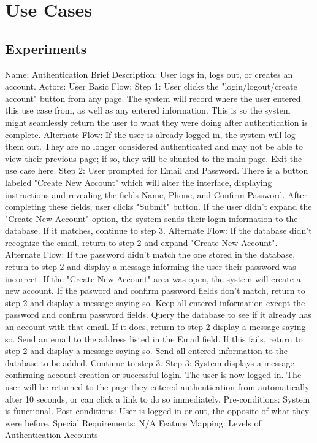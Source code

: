\section{Use Cases}
\subsection{Experiments}
\begin{outline}[enumerate]

\1 Name: Authentication
\2 Brief Description: User logs in, logs out, or creates an account.
\2 Actors: User
\2 Basic Flow:
\3 Step 1: User clicks the "login/logout/create account" button from any page.
\4 The system will record where the user entered this use case from, as well as any entered information.  This is so the system might seamlessly return the user to what they were doing after authentication is complete.
\4 Alternate Flow: If the user is already logged in, the system will log them out.  They are no longer considered authenticated and may not be able to view their previous page; if so, they will be shunted to the main page.  Exit the use case here.
\3 Step 2: User prompted for Email and Password.  There is a button labeled "Create New Account" which will alter the interface, displaying instructions and revealing the fields Name, Phone, and Confirm Password.  After completing these fields, user clicks "Submit" button.
\4 If the user didn't expand the "Create New Account" option, the system sends their login information to the database.  If it matches, continue to step 3.
\4 Alternate Flow: If the database didn't recognize the email, return to step 2 and expand "Create New Account".
\4 Alternate Flow: If the password didn't match the one stored in the database, return to step 2 and display a message informing the user their password was incorrect.
\3 If the "Create New Account" area was open, the system will create a new account.
\4 If the pasword and confirm password fields don't match, return to step 2 and display a message saying so.  Keep all entered information except the password and confirm password fields.
\4 Query the database to see if it already has an account with that email.  If it does, return to step 2 display a message saying so.
\4 Send an email to the address listed in the Email field.  If this fails, return to step 2 and display a message saying so.
\4 Send all entered information to the database to be added.  Continue to step 3.
\3 Step 3: System displays a message confirming account creation or successful login.  The user is now logged in.  The user will be returned to the page they entered authentication from automatically after 10 seconds, or can click a link to do so immediately.
\2 Pre-conditions:
\3 System is functional.
\2 Post-conditions:
\3 User is logged in or out, the opposite of what they were before.
\2 Special Requirements:
\3 N/A
\2 Feature Mapping:
\3 Levels of Authentication
\3 Accounts


\end{outline}

